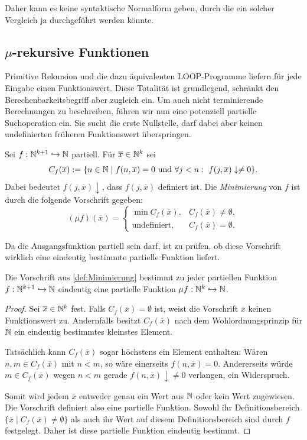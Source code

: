 Daher kann es keine syntaktische Normalform geben, durch die ein solcher Vergleich ja
durchgeführt werden könnte.

\subsection{$\mu$-rekursive Funktionen}
\label{sec:mu-rekurs-funkt}


Primitive Rekursion und die dazu äquivalenten LOOP-Programme liefern für jede
Eingabe einen Funktionswert. Diese Totalität ist grundlegend, schränkt den
Berechenbarkeitsbegriff aber zugleich ein.
Um auch nicht terminierende Berechnungen zu beschreiben, führen wir nun eine
potenziell partielle Suchoperation ein. Sie sucht die erste Nullstelle, darf
dabei aber keinen undefinierten früheren Funktionswert überspringen.
\begin{Def}[Minimierung]\label{def:Minimierung}
	Sei $f:\mathbb{N}^{k+1}\hookrightarrow\mathbb{N}$ partiell. Für
	$\overline{x}\in\mathbb{N}^k$ sei
	\[
		C_f(\overline{x})
		:=\{n\in\mathbb{N} \mid f(n,\overline{x})=0\text{ und }
		\forall j<n:\ f(j,\overline{x})\downarrow\ne0\}.
	\]
	Dabei bedeutet $f(j,\overline{x})\downarrow$, dass
	$f(j,\overline{x})$ definiert ist. Die \emph{Minimierung} von $f$ ist
	durch die folgende Vorschrift gegeben:
	\[
		(\mu f)(\overline{x})
		=
		\begin{cases}
			\min C_f(\overline{x}), & C_f(\overline{x})\ne\emptyset,\\
			\text{undefiniert}, & C_f(\overline{x})=\emptyset.
		\end{cases}
	\]
\end{Def}

Da die Ausgangsfunktion partiell sein darf, ist zu prüfen, ob diese Vorschrift
wirklich eine eindeutig bestimmte partielle Funktion liefert.
\begin{Satz}[name={Wohldefiniertheit der Minimierung}]
	\label{satz:Minimierung-wohldefiniert}
	Die Vorschrift aus \autoref{def:Minimierung} bestimmt zu jeder partiellen
	Funktion $f:\mathbb{N}^{k+1}\hookrightarrow\mathbb{N}$ eindeutig eine partielle Funktion
	$\mu f:\mathbb{N}^k\hookrightarrow\mathbb{N}$.
\end{Satz}
\begin{proof}
	Sei $\overline{x}\in\mathbb{N}^k$ fest. Falls
	$C_f(\overline{x})=\emptyset$ ist, weist die Vorschrift
	$\overline{x}$ keinen Funktionswert zu. Andernfalls besitzt
	$C_f(\overline{x})$ nach dem Wohlordnungsprinzip für $\mathbb{N}$ ein eindeutig
	bestimmtes kleinstes Element.

	Tatsächlich kann $C_f(\overline{x})$ sogar höchstens ein Element enthalten:
	Wären $n,m\in C_f(\overline{x})$ mit $n<m$, so wäre einerseits
	$f(n,\overline{x})=0$. Andererseits würde $m\in C_f(\overline{x})$ wegen
	$n<m$ gerade $f(n,\overline{x})\downarrow\ne0$ verlangen, ein Widerspruch.

	Somit wird jedem $\overline{x}$ entweder genau ein Wert aus $\mathbb{N}$ oder kein
	Wert zugewiesen. Die Vorschrift definiert also eine partielle Funktion.
	Sowohl ihr Definitionsbereich
	$\{\overline{x}\mid C_f(\overline{x})\ne\emptyset\}$ als auch ihr Wert auf
	diesem Definitionsbereich sind durch $f$ festgelegt. Daher ist diese
	partielle Funktion eindeutig bestimmt.
\end{proof}

